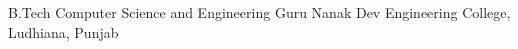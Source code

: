     {B.Tech}
    {Computer Science and Engineering}
    {Guru Nanak Dev Engineering College, Ludhiana, Punjab}
    {}
    {}

